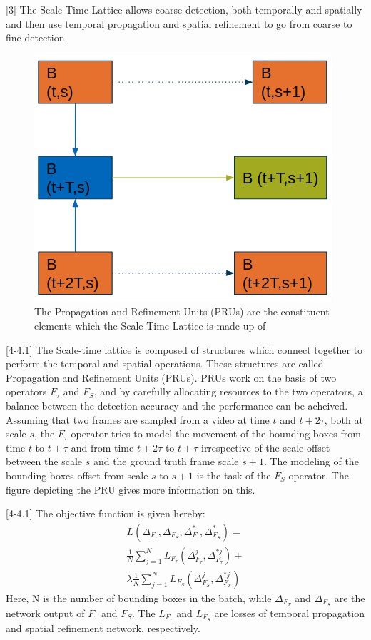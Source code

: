 \documentclass[conference]{IEEEtran}
\begin{document}
[3] The Scale-Time Lattice allows coarse detection, both temporally and spatially and then use temporal propagation and spatial refinement to go from coarse to fine detection. \newline

\begin{figure}[h]
\centering
\includegraphics[width=0.5\columnwidth]{pru}
\caption{The Propagation and Refinement Units (PRUs) are the constituent elements which the Scale-Time Lattice is made up of}
\end{figure}

[4-4.1] The Scale-time lattice is composed of structures which connect together to perform the temporal and spatial operations. These structures are called Propagation and Refinement Units (PRUs). PRUs work on the basis of two operators $F_\tau$ and $F_S$, and by carefully allocating resources to the two operators, a balance between the detection accuracy and the performance can be acheived. Assuming that two frames are sampled from a video at time $t$ and $t+2\tau$, both at scale $s$, the $F_\tau$ operator tries to model the movement of the bounding boxes from time $t$ to $t+\tau$ and from time $t+2\tau$ to $t+\tau$ irrespective of the scale offset between the scale $s$ and the ground truth frame scale $s+1$. The modeling of the bounding boxes offset from scale $s$ to $s+1$ is the task of the $F_S$ operator. The figure depicting the PRU gives more information on this. \newline

[4-4.1] The objective function is given hereby:
\begin{equation*}
\begin{aligned}
L(\Delta_{F_{\tau}} ,\Delta_{F_{S}} ,\Delta_{F_{\tau}}^{*} ,\Delta_{F_{S}}^{*} ) = \\ \frac{1}{N}\sum_{j=1}^{N}L_{F_{\tau}}(\Delta_{F_{\tau}}^{j} ,\Delta_{F_{\tau}}^{*j}) + \\ \lambda \frac{1}{N}\sum_{j=1}^{N}L_{F_{S}}(\Delta_{F_{S}}^{j} ,\Delta_{F_{S}}^{*j})
\end{aligned}
\end{equation*}
Here, N is the number of bounding boxes in the batch, while $\Delta_{F_{T}}$ and $\Delta_{F_{S}}$ are the network output of $F_{\tau}$ and $F_{S}$. The $L_{F_{\tau}}$ and $L_{F_{S}}$ are losses of temporal propagation and spatial refinement network, respectively. \newline
\end{document}
